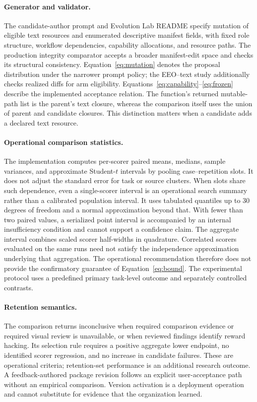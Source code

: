 \paragraph{Generator and validator.}
The candidate-author prompt and Evolution Lab README specify mutation of eligible text resources and enumerated descriptive manifest fields, with fixed role structure, workflow dependencies, capability allocations, and resource paths. The production integrity comparator accepts a broader manifest-edit space and checks its structural consistency. Equation~\ref{eq:mutation} denotes the proposal distribution under the narrower prompt policy; the EEO--text study additionally checks realized diffs for arm eligibility. Equations~\ref{eq:capability}--\ref{eq:frozen} describe the implemented acceptance relation. The function's returned mutable-path list is the parent's text closure, whereas the comparison itself uses the union of parent and candidate closures. This distinction matters when a candidate adds a declared text resource.

\paragraph{Operational comparison statistics.}
The implementation computes per-scorer paired means, medians, sample variances, and approximate Student-$t$ intervals by pooling case--repetition slots. It does not adjust the standard error for task or source clusters. When slots share such dependence, even a single-scorer interval is an operational search summary rather than a calibrated population interval. It uses tabulated quantiles up to 30 degrees of freedom and a normal approximation beyond that. With fewer than two paired values, a serialized point interval is accompanied by an internal insufficiency condition and cannot support a confidence claim. The aggregate interval combines scaled scorer half-widths in quadrature. Correlated scorers evaluated on the same runs need not satisfy the independence approximation underlying that aggregation. The operational recommendation therefore does not provide the confirmatory guarantee of Equation~\ref{eq:bound}. The experimental protocol uses a predefined primary task-level outcome and separately controlled contrasts.

\paragraph{Retention semantics.}
The comparison returns inconclusive when required comparison evidence or required visual review is unavailable, or when reviewed findings identify reward hacking. Its selection rule requires a positive aggregate lower endpoint, no identified scorer regression, and no increase in candidate failures. These are operational criteria; retention-set performance is an additional research outcome. A feedback-authored package revision follows an explicit user-acceptance path without an empirical comparison. Version activation is a deployment operation and cannot substitute for evidence that the organization learned.

